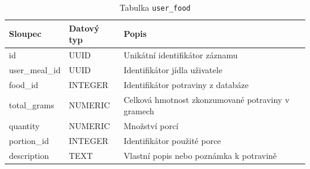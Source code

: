 \begin{table}[ht!]
    \centering
    \begin{tabularx}{\textwidth}{|l|l|L|}
        \hline
        \textbf{Sloupec} & \textbf{Datový typ} & \textbf{Popis}                                    \\ \hline
        id               & UUID                & Unikátní identifikátor záznamu                    \\ \hline
        user\_meal\_id   & UUID                & Identifikátor jídla uživatele                     \\ \hline
        food\_id         & INTEGER             & Identifikátor potraviny z databáze                \\ \hline
        total\_grams     & NUMERIC             & Celková hmotnost zkonzumované potraviny v gramech \\ \hline
        quantity         & NUMERIC             & Množství porcí                                    \\ \hline
        portion\_id      & INTEGER             & Identifikátor použité porce                       \\ \hline
        description      & TEXT                & Vlastní popis nebo poznámka k potravině           \\ \hline
    \end{tabularx}
    \caption{Tabulka \texttt{user\_food}}
    \label{tab:user_food}
\end{table}
